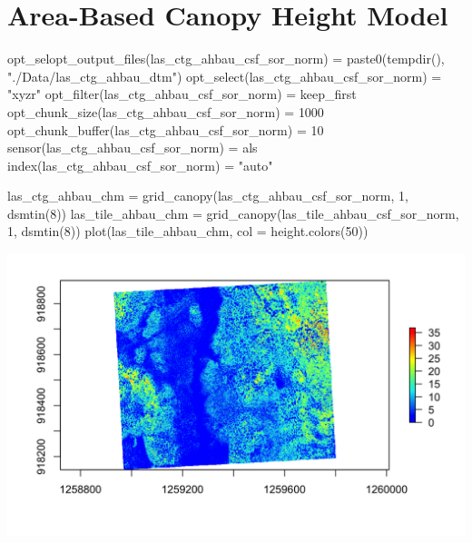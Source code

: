 \documentclass[
]{article}
\newenvironment{Shaded}{\begin{snugshade}}{\end{snugshade}}
\newcommand{\AttributeTok}[1]{\textcolor[rgb]{0.77,0.63,0.00}{#1}}
\newcommand{\DecValTok}[1]{\textcolor[rgb]{0.00,0.00,0.81}{#1}}
\newcommand{\FunctionTok}[1]{\textcolor[rgb]{0.00,0.00,0.00}{#1}}
\newcommand{\NormalTok}[1]{#1}
\newcommand{\OtherTok}[1]{\textcolor[rgb]{0.56,0.35,0.01}{#1}}
\newcommand{\StringTok}[1]{\textcolor[rgb]{0.31,0.60,0.02}{#1}}
\begin{document}
\hypertarget{area-based-canopy-height-model}{%
\section{Area-Based Canopy Height
Model}\label{area-based-canopy-height-model}}

\begin{Shaded}
\begin{Highlighting}[]
\FunctionTok{opt\_selopt\_output\_files}\NormalTok{(las\_ctg\_ahbau\_csf\_sor\_norm) }\OtherTok{=} \FunctionTok{paste0}\NormalTok{(}\FunctionTok{tempdir}\NormalTok{(), }\StringTok{"./Data/las\_ctg\_ahbau\_dtm"}\NormalTok{)}
\FunctionTok{opt\_select}\NormalTok{(las\_ctg\_ahbau\_csf\_sor\_norm) }\OtherTok{=} \StringTok{"xyzr"}
\FunctionTok{opt\_filter}\NormalTok{(las\_ctg\_ahbau\_csf\_sor\_norm) }\OtherTok{=} \StringTok{\textquotesingle{}{-}keep\_first\textquotesingle{}} 
\FunctionTok{opt\_chunk\_size}\NormalTok{(las\_ctg\_ahbau\_csf\_sor\_norm) }\OtherTok{=} \DecValTok{1000} 
\FunctionTok{opt\_chunk\_buffer}\NormalTok{(las\_ctg\_ahbau\_csf\_sor\_norm) }\OtherTok{=} \DecValTok{10}
\FunctionTok{sensor}\NormalTok{(las\_ctg\_ahbau\_csf\_sor\_norm) }\OtherTok{=} \StringTok{\textquotesingle{}als\textquotesingle{}}
\FunctionTok{index}\NormalTok{(las\_ctg\_ahbau\_csf\_sor\_norm) }\OtherTok{=} \StringTok{"auto"}

\NormalTok{las\_ctg\_ahbau\_chm }\OtherTok{=} \FunctionTok{grid\_canopy}\NormalTok{(las\_ctg\_ahbau\_csf\_sor\_norm, }\DecValTok{1}\NormalTok{, }\FunctionTok{dsmtin}\NormalTok{(}\DecValTok{8}\NormalTok{))}
\NormalTok{las\_tile\_ahbau\_chm }\OtherTok{=} \FunctionTok{grid\_canopy}\NormalTok{(las\_tile\_ahbau\_csf\_sor\_norm, }\DecValTok{1}\NormalTok{, }\FunctionTok{dsmtin}\NormalTok{(}\DecValTok{8}\NormalTok{))}
\FunctionTok{plot}\NormalTok{(las\_tile\_ahbau\_chm, }\AttributeTok{col =} \FunctionTok{height.colors}\NormalTok{(}\DecValTok{50}\NormalTok{))}
\end{Highlighting}
\end{Shaded}

\includegraphics{13_lidR_PointCloud_Processing_files/markdown_pngs/las_tile_ahbau_chm}
\end{document}
